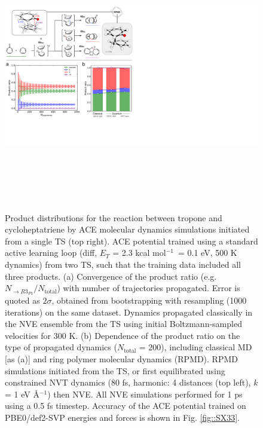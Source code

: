 \documentclass[twoside,twocolumn,9pt]{article}
\newcommand{\kcal}{kcal mol$^{-1}$}
\begin{document}
\begin{figure}[b]
	\centering
	\includegraphics[height=11.8cm]{figX2}
	\caption{Product distributions for the reaction between tropone and cycloheptatriene by ACE molecular dynamics simulations initiated from a single TS (top right). ACE potential trained using a standard active learning loop (diff, $E_T$ = 2.3 \kcal~= 0.1 eV, 500 K dynamics) from two TS, such that the training data included all three products. (a) Convergence of the product ratio (e.g. $N_{\rightarrow R3_{P1}} / N_\text{total}$) with number of trajectories propagated. Error is quoted as $2\sigma$, obtained from bootstrapping with resampling (1000 iterations) on the same dataset. Dynamics propagated classically in the NVE ensemble from the TS using initial Boltzmann-sampled velocities for 300 K. (b) Dependence of the product ratio on the type of propagated dynamics ($N_\text{total}$ = 200), including classical MD [as (a)] and ring polymer molecular dynamics (RPMD). RPMD simulations initiated from the TS, or first equilibrated using constrained NVT dynamics (80 fs, harmonic: 4 distances (top left), $k$ = 1 eV \AA${}^{-1}$) then NVE. All NVE simulations performed for 1 ps using a 0.5 fs timestep. Accuracy of the ACE potential trained on PBE0/def2-SVP energies and forces is shown in Fig. \ref{fig::SX33}.}
	\label{fig::X2}
\end{figure}
\end{document}

